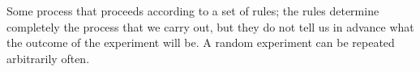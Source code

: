 Some process that proceeds according to a set of rules; the rules
determine completely the process that we carry out, but they do not 
tell us in advance what the outcome of the experiment will be.
A random experiment can be repeated arbitrarily often.